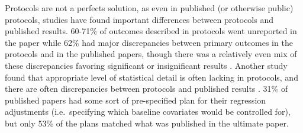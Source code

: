 \documentclass[12pt] {article}
\begin{document}
Protocols are not a perfects solution, as even in published (or otherwise public) protocols, studies have found important differences between protocols and published results. 60-71\%
of outcomes described in protocols went unreported in the paper while
62\% had major discrepancies between primary outcomes in the protocols
and in the published papers, though there was a relatively even mix of
these discrepancies favoring significant or insignificant results \citep{chan_a_empirical_2004}. Another study found that appropriate level of statistical detail is often lacking in protocols, and there are often discrepancies between protocols and published results \citep{saquib_practices_2013}. 31\% of published papers had some sort of pre-specified plan for their regression adjustments (i.e.~specifying which baseline covariates would be controlled for), %
but only 53\% of the plans matched what was published in the ultimate paper.
\end{document}
